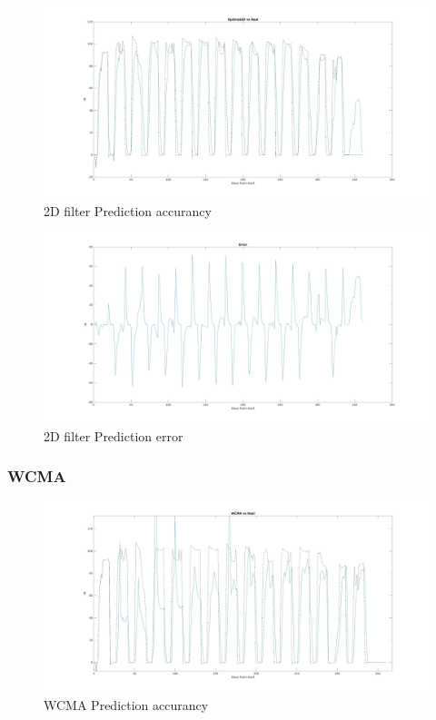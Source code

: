 \begin{figure}[h]
    \includegraphics[width=\textwidth]{Optimal2D.jpg}
    \caption{2D filter Prediction accurancy}
    \label{fig:o2d_comp}
\end{figure}

\begin{figure}[h]
    \includegraphics[width=\textwidth]{Optimal2D_error.jpg}
    \caption{2D filter Prediction error}
    \label{fig:o2d_error}
\end{figure}


\subsubsection{WCMA} 
\label{ssub:wcma}
\begin{figure}[h]
    \includegraphics[width=\textwidth]{WCMA.jpg}
    \caption{WCMA Prediction accurancy}
    \label{fig:wcma_comp}
\end{figure}

